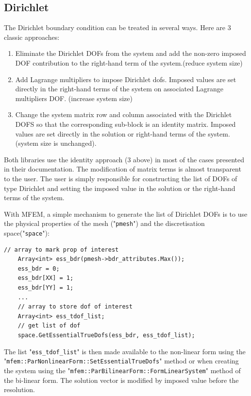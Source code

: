 \documentclass[12pt]{article}
\newcommand{\mycode}[1]{\textsf{"}\lstinline`#1`\textsf{"}}
\begin{document}
\subsection{Dirichlet\label{bc_dirichlet}}
The Dirichlet boundary condition can be treated in several ways. Here are 3 classic approaches:
\begin{enumerate}
	\item  Eliminate the Dirichlet DOFs from the system and add the non-zero imposed DOF contribution to the right-hand term of the system.(reduce system size)
	\item Add Lagrange multipliers to impose Dirichlet dofs. Imposed values are set directly in the right-hand terms of the system on associated Lagrange multipliers DOF.  (increase system size)
	\item Change the system matrix row and column associated with the Dirichlet DOFS so that the corresponding sub-block is an identity matrix. Imposed values are set directly in the solution or right-hand terms of the system. (system size is unchanged).
\end{enumerate}
Both libraries use the identity approach (3 above) in most of the cases presented in their documentation. 
The modification of matrix terms is almost transparent to the user. 
The user is simply responsible for constructing the list of DOFs of type Dirichlet and setting the imposed value in the solution or the right-hand terms of the system.

With MFEM, a simple mechanism to generate the list of Dirichlet DOFs is to use the physical properties of the mesh (\mycode{pmesh}) and the discretisation space(\mycode{space}): 
\begin{lstlisting}[numbers=none,basicstyle=\footnotesize,label=listDiriDoffs]
	// array to mark prop of interest 
	Array<int> ess_bdr(pmesh->bdr_attributes.Max());
	ess_bdr = 0;
	ess_bdr[XX] = 1;
	ess_bdr[YY] = 1;
	...
	// array to store dof of interest
	Array<int> ess_tdof_list;
	// get list of dof
	space.GetEssentialTrueDofs(ess_bdr, ess_tdof_list);
\end{lstlisting}
The list \mycode{ess_tdof_list} is then made available to the non-linear form using the \mycode{mfem::ParNonlinearForm::SetEssentialTrueDofs} method or when creating the system  using the \mycode{mfem::ParBilinearForm::FormLinearSystem} method of the bi-linear form.
The solution vector is modified by imposed value before the resolution.
\end{document}
